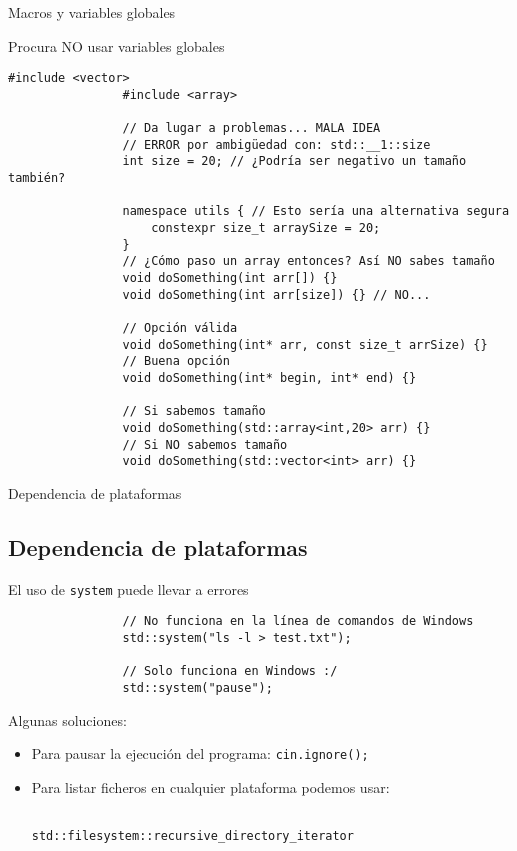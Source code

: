 \documentclass{beamer}
\newcommand{\normalSizeItem}[1] {
  \normalsize{\item #1}
}
\begin{document}
		\begin{frame}[fragile]{Macros y variables globales}	
			\begin{itemize}
			
				\normalSizeItem{Procura NO usar variables globales}
				\begin{lstlisting}[basicstyle={\tiny\ttfamily}]
				#include <vector>
				#include <array>
				
				// Da lugar a problemas... MALA IDEA
				// ERROR por ambigüedad con: std::__1::size
				int size = 20; // ¿Podría ser negativo un tamaño también?
				
				namespace utils { // Esto sería una alternativa segura
					constexpr size_t arraySize = 20;
				}
				// ¿Cómo paso un array entonces? Así NO sabes tamaño
				void doSomething(int arr[]) {}
				void doSomething(int arr[size]) {} // NO...
				
				// Opción válida
				void doSomething(int* arr, const size_t arrSize) {}
				// Buena opción
				void doSomething(int* begin, int* end) {}
				
				// Si sabemos tamaño
				void doSomething(std::array<int,20> arr) {}
				// Si NO sabemos tamaño
				void doSomething(std::vector<int> arr) {}
				\end{lstlisting}
				
			\end{itemize}
		\end{frame}
		
		\begin{frame}[fragile]{Dependencia de plataformas}	
			\subsection{Dependencia de plataformas}		
			\begin{itemize}

				\normalSizeItem { El uso de \texttt{system} puede llevar a errores}
				\begin{lstlisting}
				// No funciona en la línea de comandos de Windows
				std::system("ls -l > test.txt");
				
				// Solo funciona en Windows :/
				std::system("pause"); 
				\end{lstlisting}
				
				\item { 
					
					Algunas soluciones: 
								
					\begin{itemize}
						\item {
							Para pausar la ejecución del programa: \texttt{cin.ignore();}
						}
						\item {
							Para listar ficheros en cualquier plataforma podemos usar:
							 \begin{verbatim}
							 	std::filesystem::recursive_directory_iterator
							 \end{verbatim}
						}					
					\end{itemize}
				}
			\end{itemize}
		\end{frame}
		
\end{document}
